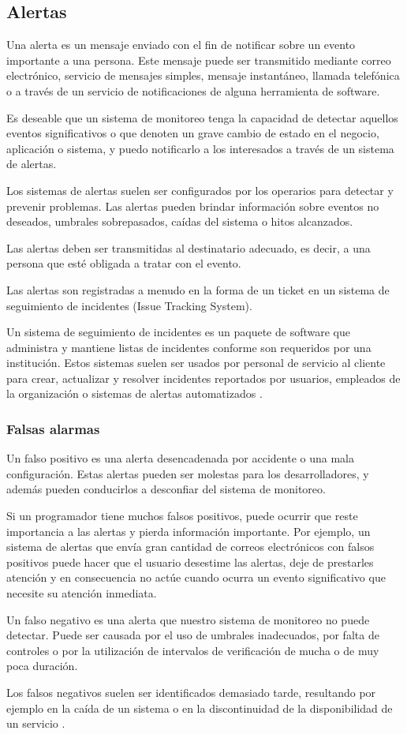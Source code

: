\subsection{Alertas}
\label{alertas}
Una alerta es un mensaje enviado con el fin de notificar sobre un evento importante a una persona. Este mensaje puede ser transmitido mediante correo electrónico, servicio de mensajes simples, mensaje instantáneo, llamada telefónica o a través de un servicio de notificaciones de alguna herramienta de software.

Es deseable que un sistema de monitoreo tenga la capacidad de detectar aquellos eventos significativos o que denoten un grave cambio de estado en el negocio, aplicación o sistema, y puedo notificarlo a los interesados a través de un sistema de alertas.

Los sistemas de alertas suelen ser configurados por los operarios para detectar y prevenir problemas. Las alertas pueden brindar información sobre eventos no deseados, umbrales sobrepasados, caídas del sistema o hitos alcanzados.

Las alertas deben ser transmitidas al destinatario adecuado, es decir, a una persona que esté obligada a tratar con el evento.

Las alertas son registradas a menudo en la forma de un ticket en un sistema de seguimiento de incidentes (Issue Tracking System).

Un sistema de seguimiento de incidentes es un paquete de software que administra y mantiene listas de incidentes conforme son requeridos por una institución. Estos sistemas suelen ser usados por personal de servicio al cliente para crear, actualizar y resolver incidentes reportados por usuarios, empleados de la organización o sistemas de alertas automatizados \cite[p~.2]{monitoreo:efective_monitoring_and_alerting}.

\subsubsection*{Falsas alarmas}
\label{falsas_alarmas}

Un falso positivo es una alerta desencadenada por accidente o una mala configuración. Estas alertas pueden ser molestas para los desarrolladores, y además pueden conducirlos a desconfiar del sistema de monitoreo.

Si un programador tiene muchos falsos positivos, puede ocurrir que reste importancia a las alertas y pierda información importante. Por ejemplo, un sistema de alertas que envía gran cantidad de correos electrónicos con falsos positivos puede hacer que el usuario desestime las alertas, deje de prestarles atención y en consecuencia no actúe cuando ocurra un evento significativo que necesite su atención inmediata.

Un falso negativo es una alerta que nuestro sistema de monitoreo no puede detectar. Puede ser causada por el uso de umbrales inadecuados, por falta de controles o por la utilización de intervalos de verificación de mucha o de muy poca duración.

Los falsos negativos suelen ser identificados demasiado tarde, resultando por ejemplo en la caída de un sistema o en la discontinuidad de la disponibilidad de un servicio \cite[p.~16]{monitoreo:monitoring_with_grapfite}.
